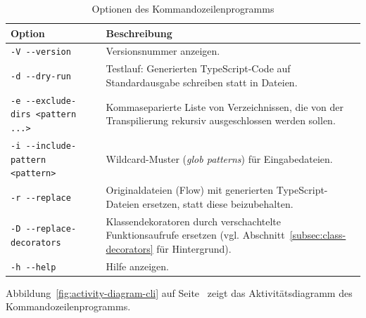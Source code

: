 \bigskip
\begin{table}[tbh]
  \small
  \begin{tabularx}{\textwidth}{@{}lX@{}}
    \midrule
    \textbf{Option} & \textbf{Beschreibung} \\
    \midrule
    \smallskip
    \texttt{-V -{}-version} & Versionsnummer anzeigen. \\
    \smallskip
    \texttt{-d -{}-dry-run} & Testlauf: Generierten TypeScript-Code auf Standardausgabe schreiben statt in Dateien.\\
    \smallskip
    \texttt{-e -{}-exclude-dirs <pattern ...>} & Kommaseparierte Liste von Verzeichnissen, die von der Transpilierung rekursiv ausgeschlossen werden sollen. \\
    \smallskip
    \texttt{-i -{}-include-pattern <pattern>} & Wildcard-Muster (\textit{glob patterns}) für Eingabedateien. \\
    \smallskip
    \texttt{-r -{}-replace} & Originaldateien (Flow) mit generierten TypeScript-Dateien ersetzen, statt diese beizubehalten. \\
    \smallskip
    \texttt{-D -{}-replace-decorators} & Klassendekoratoren durch verschachtelte Funktionsaufrufe ersetzen (vgl. Abschnitt~\ref{subsec:class-decorators} für Hintergrund). \\
    \smallskip
    \texttt{-h -{}-help} & Hilfe anzeigen. \\
    \midrule
  \end{tabularx}
  \caption{Optionen des Kommandozeilenprogramms}
  \label{tab:cli-options}
\end{table}




Abbildung~\ref{fig:activity-diagram-cli} auf Seite~\pageref{fig:activity-diagram-cli} zeigt das Aktivitätsdiagramm des Kommandozeilenprogramms.

